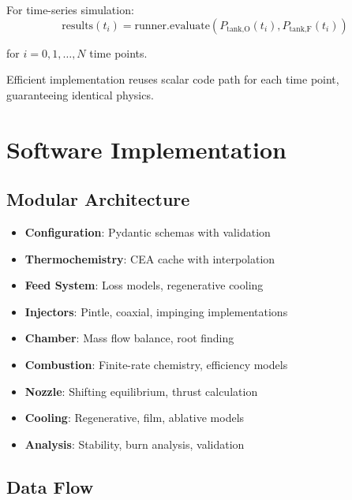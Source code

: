 \documentclass[12pt,a4paper]{article}
\begin{document}
For time-series simulation:
\begin{equation}
\text{results}(t_i) = \text{runner.evaluate}(P_{\text{tank,O}}(t_i), P_{\text{tank,F}}(t_i))
\end{equation}

for $i = 0, 1, \ldots, N$ time points.

Efficient implementation reuses scalar code path for each time point, guaranteeing identical physics.

\section{Software Implementation}

\subsection{Modular Architecture}

\begin{itemize}
    \item \textbf{Configuration}: Pydantic schemas with validation
    \item \textbf{Thermochemistry}: CEA cache with interpolation
    \item \textbf{Feed System}: Loss models, regenerative cooling
    \item \textbf{Injectors}: Pintle, coaxial, impinging implementations
    \item \textbf{Chamber}: Mass flow balance, root finding
    \item \textbf{Combustion}: Finite-rate chemistry, efficiency models
    \item \textbf{Nozzle}: Shifting equilibrium, thrust calculation
    \item \textbf{Cooling}: Regenerative, film, ablative models
    \item \textbf{Analysis}: Stability, burn analysis, validation
\end{itemize}

\subsection{Data Flow}
\end{document}
